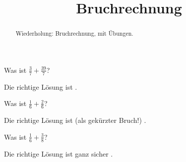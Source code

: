\documentclass{ximera}
\title{Bruchrechnung}
\begin{document}
\begin{abstract}
Wiederholung: Bruchrechnung, mit Übungen.
\end{abstract}
\maketitle

\begin{question}
Was ist $\frac 37 + \frac{39}{7}$?
\begin{solution}
Die richtige Lösung ist
.
\end{solution}
\end{question}

\begin{question}
Was ist $\frac{1}{6} + \frac{2}{6}$?
\begin{solution}
Die richtige Lösung ist (als gekürzter Bruch!)
.
\end{solution}
\end{question}

\begin{question}
Was ist $\frac{1}{6} + \frac{3}{8}$?
\begin{solution}
Die richtige Lösung ist ganz sicher
.
\end{solution}
\end{question}
\end{document}
